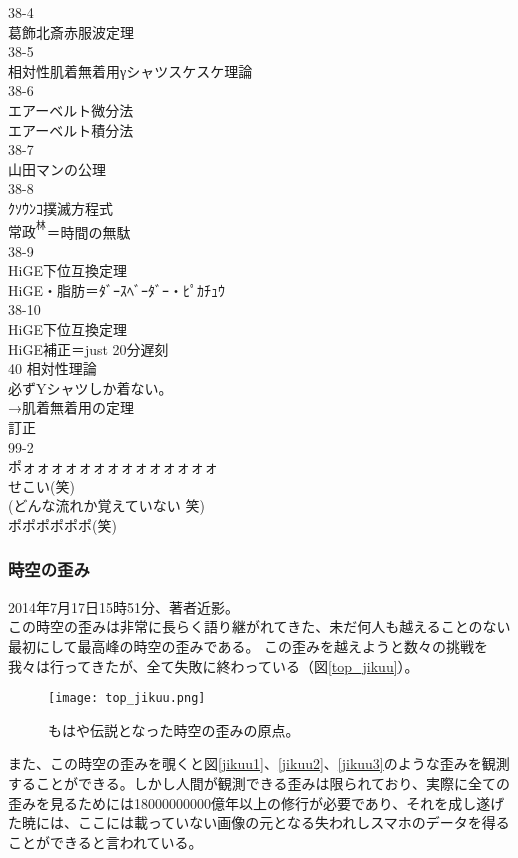 38-4\\
葛飾北斎赤服波定理\\
38-5\\
相対性肌着無着用γシャツスケスケ理論\\
38-6\\
エアーベルト微分法\\
エアーベルト積分法\\
38-7\\
山田マンの公理\\
38-8\\
ｸｿｳﾝｺ撲滅方程式\\
$常政^林$＝時間の無駄\\
38-9\\
HiGE下位互換定理\\
HiGE・脂肪＝ﾀﾞｰｽﾍﾞｰﾀﾞｰ・ﾋﾟｶﾁｭｳ\\
38-10\\
HiGE下位互換定理\\
HiGE補正＝just 20分遅刻\\
40 相対性理論\\
必ずYシャツしか着ない。\\
→肌着無着用の定理\\
訂正\\
99-2\\
ポォォォォォォォォォォォォォォ\\
せこい(笑)\\
(どんな流れか覚えていない 笑)\\
ポポポポポポ(笑)\\

\subsubsection{時空の歪み}
2014年7月17日15時51分、著者近影。\\
この時空の歪みは非常に長らく語り継がれてきた、未だ何人も越えることのない最初にして最高峰の時空の歪みである。 この歪みを越えようと数々の挑戦を我々は行ってきたが、全て失敗に終わっている（図\ref{top_jikuu}）。\\

\begin{figure}[H]
  \centering
  \texttt{[image: top\_jikuu.png]}
  \caption{もはや伝説となった時空の歪みの原点。}
\label{top_jukuu}
\end{figure}

また、この時空の歪みを覗くと図\ref{jikuu1}、\ref{jikuu2}、\ref{jikuu3}のような歪みを観測することができる。しかし人間が観測できる歪みは限られており、実際に全ての歪みを見るためには18000000000億年以上の修行が必要であり、それを成し遂げた暁には、ここには載っていない画像の元となる失われしスマホのデータを得ることができると言われている。\\


